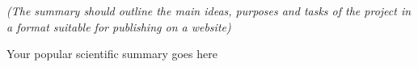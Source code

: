 %
%
\textit{(The summary should outline the main ideas, purposes and tasks of the project in a format suitable for publishing on a website)}
\vspace{1cm}

Your popular scientific summary goes here